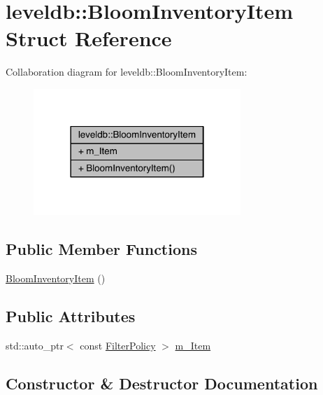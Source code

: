 \hypertarget{structleveldb_1_1_bloom_inventory_item}{}\section{leveldb\+:\+:Bloom\+Inventory\+Item Struct Reference}
\label{structleveldb_1_1_bloom_inventory_item}


Collaboration diagram for leveldb\+:\+:Bloom\+Inventory\+Item\+:\nopagebreak
\begin{figure}[H]
\begin{center}
\leavevmode
\includegraphics[width=222pt]{structleveldb_1_1_bloom_inventory_item__coll__graph}
\end{center}
\end{figure}
\subsection*{Public Member Functions}
\begin{DoxyCompactItemize}
\item 
\hyperlink{structleveldb_1_1_bloom_inventory_item_ae5ebefa54906ee1a490137799b6d1d09}{Bloom\+Inventory\+Item} ()
\end{DoxyCompactItemize}
\subsection*{Public Attributes}
\begin{DoxyCompactItemize}
\item 
std\+::auto\+\_\+ptr$<$ const \hyperlink{classleveldb_1_1_filter_policy}{Filter\+Policy} $>$ \hyperlink{structleveldb_1_1_bloom_inventory_item_aa9c9b96fbcf1ce332ca0cbb9ff06d5a6}{m\+\_\+\+Item}
\end{DoxyCompactItemize}


\subsection{Constructor \& Destructor Documentation}
\hypertarget{structleveldb_1_1_bloom_inventory_item_ae5ebefa54906ee1a490137799b6d1d09}{}
